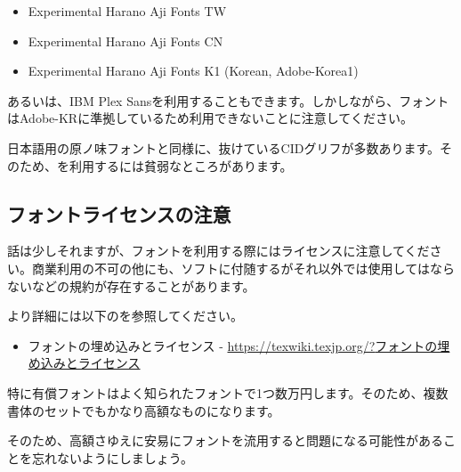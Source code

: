 \documentclass[../otf-unofficial-guide]{subfiles}
\begin{document}
\begin{itemize}
  \item Experimental Harano Aji Fonts TW
  \item Experimental Harano Aji Fonts CN
  \item Experimental Harano Aji Fonts K1 (Korean, Adobe-Korea1)
\end{itemize}

あるいは、IBM Plex Sansを利用することもできます。しかしながら、{\munja}フォントはAdobe-KRに準拠しているため利用できないことに注意してください。

日本語用の原ノ味フォントと同様に、抜けているCIDグリフが多数あります。そのため、を利用するには貧弱なところがあります。

\subsection{フォントライセンスの注意}

話は少しそれますが、フォントを利用する際にはライセンスに注意してください。商業利用の不可の他にも、ソフトに付随するがそれ以外では使用してはならないなどの規約が存在することがあります。

より詳細には以下の{\TeXWiki}を参照してください。

\begin{itemize}
  \item フォントの埋め込みとライセンス - {\TeXWiki}
  \href{https://texwiki.texjp.org/?%E3%83%95%E3%82%A9%E3%83%B3%E3%83%88%E3%81%AE%E5%9F%8B%E3%82%81%E8%BE%BC%E3%81%BF%E3%81%A8%E3%83%A9%E3%82%A4%E3%82%BB%E3%83%B3%E3%82%B9}{\ttfamily https://texwiki.texjp.org/?{\jpinurl フォントの埋め込みとライセンス}}
\end{itemize}

特に有償フォントはよく知られたフォントで1つ数万円します。そのため、複数書体のセットでもかなり高額なものになります。

そのため、高額さゆえに安易にフォントを流用すると問題になる可能性があることを忘れないようにしましょう。
\end{document}
